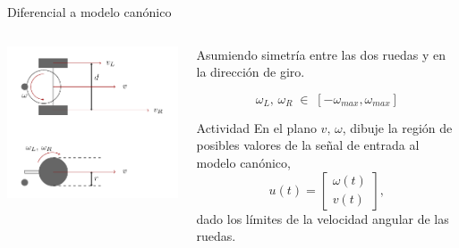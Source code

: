 \documentclass[presentation,aspectratio=169]{beamer}
\begin{document}
\begin{frame}[label={sec:org330e57c}]{Diferencial a modelo canónico}
\begin{columns}
\begin{column}{0.4\columnwidth}
\begin{center}
 \includegraphics[width=.8\linewidth]{../figures/unicycle-model-details}
\end{center}
\end{column}

\begin{column}{0.6\columnwidth}
Asumiendo simetría entre las dos ruedas y en la dirección de giro.

\[ \omega_L,\, \omega_R \; \in \; [-\omega_{max}, \omega_{max}]\]

\pause

\alert{Actividad}
En el plano \(v,\, \omega\),  dibuje la región de posibles valores de la señal de entrada al modelo canónico,
\[ u(t) = \begin{bmatrix} \omega(t)\\v(t) \end{bmatrix}, \]
dado los límites de la velocidad angular de las ruedas.
\end{column}
\end{columns}
\end{frame}
\end{document}
